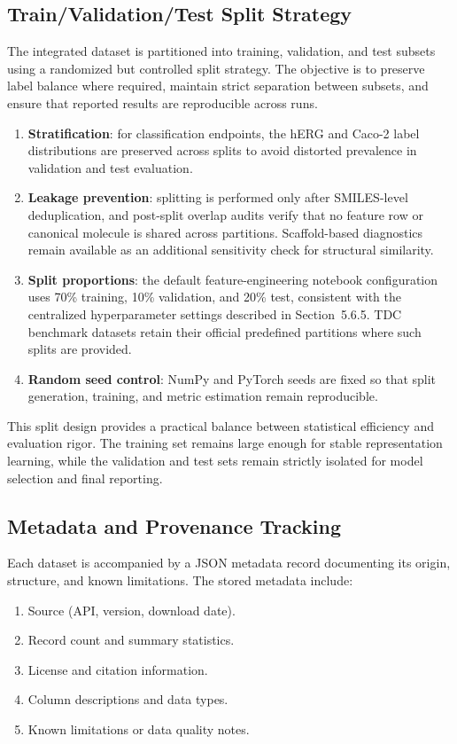 \documentclass[a4paper,11pt,twoside]{report}
\begin{document}
\subsection{Train/Validation/Test Split Strategy}

The integrated dataset is partitioned into training, validation, and test subsets using a randomized but controlled split strategy. The objective is to preserve label balance where required, maintain strict separation between subsets, and ensure that reported results are reproducible across runs.

\begin{enumerate}
\item \textbf{Stratification}: for classification endpoints, the hERG and Caco-2 label distributions are preserved across splits to avoid distorted prevalence in validation and test evaluation.
\item \textbf{Leakage prevention}: splitting is performed only after SMILES-level deduplication, and post-split overlap audits verify that no feature row or canonical molecule is shared across partitions. Scaffold-based diagnostics remain available as an additional sensitivity check for structural similarity.
\item \textbf{Split proportions}: the default feature-engineering notebook configuration uses 70\% training, 10\% validation, and 20\% test, consistent with the centralized hyperparameter settings described in Section~5.6.5. TDC benchmark datasets retain their official predefined partitions where such splits are provided.
\item \textbf{Random seed control}: NumPy and PyTorch seeds are fixed so that split generation, training, and metric estimation remain reproducible.
\end{enumerate}

This split design provides a practical balance between statistical efficiency and evaluation rigor. The training set remains large enough for stable representation learning, while the validation and test sets remain strictly isolated for model selection and final reporting.

\subsection{Metadata and Provenance Tracking}

Each dataset is accompanied by a JSON metadata record documenting its origin, structure, and known limitations. The stored metadata include:
\begin{enumerate}
\item Source (API, version, download date).
\item Record count and summary statistics.
\item License and citation information.
\item Column descriptions and data types.
\item Known limitations or data quality notes.
\end{enumerate}
\end{document}
